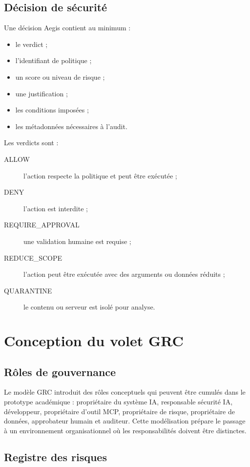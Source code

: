 \subsection{Décision de sécurité}

Une décision Aegis contient au minimum :

\begin{itemize}
    \item le verdict ;
    \item l'identifiant de politique ;
    \item un score ou niveau de risque ;
    \item une justification ;
    \item les conditions imposées ;
    \item les métadonnées nécessaires à l'audit.
\end{itemize}

Les verdicts sont :

\begin{description}
    \item[ALLOW] l'action respecte la politique et peut être exécutée ;
    \item[DENY] l'action est interdite ;
    \item[REQUIRE\_APPROVAL] une validation humaine est requise ;
    \item[REDUCE\_SCOPE] l'action peut être exécutée avec des arguments ou données réduits ;
    \item[QUARANTINE] le contenu ou serveur est isolé pour analyse.
\end{description}

\section{Conception du volet GRC}

\subsection{Rôles de gouvernance}

Le modèle GRC introduit des rôles conceptuels qui peuvent être cumulés dans le prototype académique : propriétaire du système IA, responsable sécurité IA, développeur, propriétaire d'outil MCP, propriétaire de risque, propriétaire de données, approbateur humain et auditeur. Cette modélisation prépare le passage à un environnement organisationnel où les responsabilités doivent être distinctes.

\subsection{Registre des risques}

